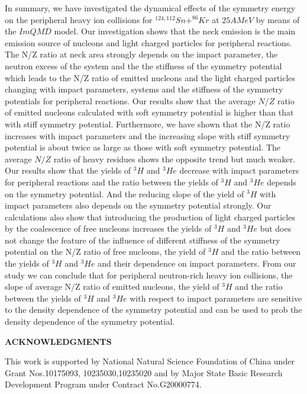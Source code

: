 \documentclass[aps,prc,groupedaddress,showpacs,manuscript]{revtex4}
\begin{document}
In summary, we have investigated the dynamical effects of the
symmetry energy on the peripheral heavy ion collisions for
$^{124,112}Sn+^{86}Kr$ at $25AMeV$ by means of the $ImQMD$ model.
Our investigation shows that the neck emission is the main
emission source of nucleons and light charged particles for
peripheral reactions. The N/Z ratio at neck area strongly depends
on the impact parameter, the neutron excess of the system and the
the stiffness of the symmetry potential which leads to the N/Z
ratio of emitted nucleons and the light charged particles changing
with impact parameters, systems and the stiffness of the symmetry
potentials for peripheral reactions. Our results show that the
average $N/Z$ ratio of emitted nucleons calculated with soft
symmetry potential is higher than that with stiff symmetry
potential. Furthermore, we have shown that the N/Z ratio increases
with impact parameters and the increasing slope with stiff
symmetry potential is about twice as large as those with soft
symmetry potential. The average $N/Z$ ratio of heavy residues
shows the opposite trend but much weaker.  Our results show that
the yields of $^{3}H$ and $^{3}He$ decrease with impact parameters
for peripheral reactions and the ratio between the yields of
$^{3}H$ and $^{3}He$ depends on the symmetry potential. And the
reducing slope of the yield of $^{3}H$ with impact parameters also
depends on the symmetry potential strongly. Our calculations also
show that introducing the production of light charged particles by
the coalescence of free nucleons increases the yields of $^{3}H$
and $^{3}He$ but does not change the feature of the influence of
different stiffness of the symmetry potential on the N/Z ratio of
free nucleons, the yield of $^{3}H$ and the ratio between the
yields of $^{3}H$ and $^{3}He$ and their dependence on impact
parameters. From our study we can conclude that for peripheral
neutron-rich heavy ion collisions, the slope of average N/Z ratio
of emitted nucleons, the yield of $^{3}H$  and the ratio between
the yields of $^{3}H$ and $^{3}He$ with respect to impact
parameters are sensitive to the density dependence of the symmetry
potential and can be used to prob the density dependence of the
symmetry potential.

\begin{center}
{\bf ACKNOWLEDGMENTS}
\end{center}
 This work is supported by National Natural
Science Foundation of China under Grant Nos.10175093,
10235030,10235020 and by Major State Basic Research Development
Program under Contract No.G20000774.
\end{document}
